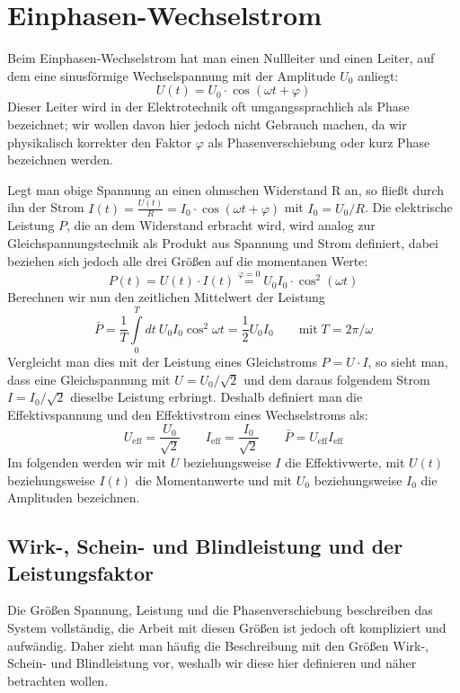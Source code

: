 
\section{Einphasen-Wechselstrom}\label{wechsel}
Beim Einphasen-Wechselstrom hat man einen Nullleiter und einen Leiter, auf dem eine sinusförmige Wechselspannung mit der Amplitude $U_0$ anliegt:
\begin{equation}
U(t)=U_0 \cdot \cos(\omega t + \varphi)
\end{equation}
Dieser Leiter wird in der Elektrotechnik oft umgangssprachlich als Phase bezeichnet; wir wollen davon hier jedoch nicht Gebrauch machen, da wir physikalisch korrekter den Faktor $\varphi$ als Phasenverschiebung oder kurz Phase bezeichnen werden.

Legt man obige Spannung an einen ohmschen Widerstand R an, so fließt durch ihn der Strom $I(t)= \frac{U(t)}{R} = I_0 \cdot \cos(\omega t + \varphi)$ mit $I_0 = U_0/R$.
Die elektrische Leistung $P$, die an dem Widerstand erbracht wird, wird analog zur Gleichspannungstechnik als Produkt aus Spannung und Strom definiert, dabei beziehen sich jedoch alle drei Größen auf die momentanen Werte:
\begin{equation}
P(t) = U(t) \cdot I(t) \stackrel{\mathrm{\varphi=0}}= U_0 I_0 \cdot \cos^2(\omega t)
\end{equation}
Berechnen wir nun den zeitlichen Mittelwert der Leistung
\begin{equation}\label{Wirkleistung_ohne_phi}
\bar{P}=\frac1T \int\limits_0^T dt\: U_0 I_0 \cos^2 \omega t = \frac12 U_0 I_0 \qquad\mathrm{mit}\; T=2\pi/\omega
\end{equation}
Vergleicht man dies mit der Leistung eines Gleichstroms $P=U\cdot I$, so sieht man, dass eine Gleichspannung mit $U=U_0 / \sqrt2$ und dem daraus folgendem Strom $I=I_0 / \sqrt2$ dieselbe Leistung erbringt.
Deshalb definiert man die Effektivspannung und den Effektivstrom eines Wechselstroms als:
\begin{equation*}
U_{\mathrm{eff}} = \frac{U_0}{\sqrt2} \qquad I_{\mathrm{eff}} = \frac{I_0}{\sqrt2} \qquad \bar{P}=U_{\mathrm{eff}}I_{\mathrm{eff}}
\end{equation*}
Im folgenden werden wir mit $U$ beziehungsweise $I$ die Effektivwerte, mit $U(t)$ beziehungsweise $I(t)$ die Momentanwerte und mit $U_0$ beziehungsweise $I_0$ die Amplituden bezeichnen.





\subsection{Wirk-, Schein- und Blindleistung und der Leistungsfaktor}
Die Größen Spannung, Leistung und die Phasenverschiebung beschreiben das System vollständig, die Arbeit mit diesen Größen ist jedoch oft kompliziert und aufwändig. Daher zieht man häufig die Beschreibung mit den Größen Wirk-, Schein- und Blindleistung vor, weshalb wir diese hier definieren und näher betrachten wollen.

